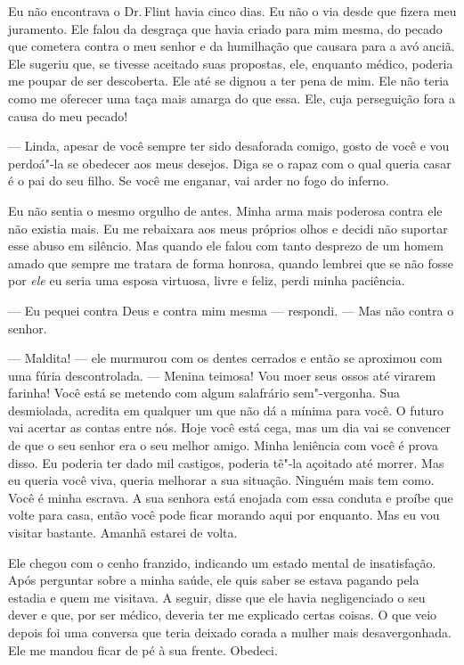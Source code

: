 Eu não encontrava o Dr.\,Flint havia
cinco dias. Eu não o via desde que fizera meu juramento. Ele falou da
desgraça que havia criado para mim mesma, do pecado que cometera contra
o meu senhor e da humilhação que causara para a avó anciã. Ele sugeriu
que, se tivesse aceitado suas propostas, ele, enquanto médico, poderia
me poupar de ser descoberta. Ele até se dignou a ter pena de mim. Ele
não teria como me oferecer uma taça mais amarga do que essa. Ele, cuja
perseguição fora a causa do meu pecado!

--- Linda, apesar de você sempre ter
sido desaforada comigo, gosto de você e vou perdoá"-la se obedecer aos
meus desejos. Diga se o rapaz com o qual queria casar é o pai do seu
filho. Se você me enganar, vai arder no fogo do inferno.

Eu não sentia o mesmo orgulho de antes.
Minha arma mais poderosa contra ele não existia mais. Eu me rebaixara
aos meus próprios olhos e decidi não suportar esse abuso em silêncio.
Mas quando ele falou com tanto desprezo de um homem amado que sempre me
tratara de forma honrosa, quando lembrei que se não fosse por \emph{ele}
eu seria uma esposa virtuosa, livre e feliz, perdi minha paciência.

--- Eu pequei contra Deus e contra mim mesma --- respondi. --- Mas não
contra o senhor.

--- Maldita! --- ele murmurou com os
dentes cerrados e então se aproximou com uma fúria descontrolada. ---
Menina teimosa! Vou moer seus ossos até virarem farinha! Você está se
metendo com algum salafrário sem"-vergonha. Sua desmiolada, acredita em
qualquer um que não dá a mínima para você. O futuro vai acertar as
contas entre nós. Hoje você está cega, mas um dia vai se convencer de
que o seu senhor era o seu melhor amigo. Minha leniência com você é
prova disso. Eu poderia ter dado mil castigos, poderia tê"-la açoitado
até morrer. Mas eu queria você viva, queria melhorar a sua situação.
Ninguém mais tem como. Você é minha escrava. A sua senhora está enojada
com essa conduta e proíbe que volte para casa, então você pode ficar
morando aqui por enquanto. Mas eu vou visitar bastante. Amanhã estarei
de volta.

Ele chegou com o cenho franzido,
indicando um estado mental de insatisfação. Após perguntar sobre a minha
saúde, ele quis saber se estava pagando pela estadia e quem me visitava.
A seguir, disse que ele havia negligenciado o seu dever e que, por ser
médico, deveria ter me explicado certas coisas. O que veio depois foi
uma conversa que teria deixado corada a mulher mais desavergonhada. Ele
me mandou ficar de pé à sua frente. Obedeci.

